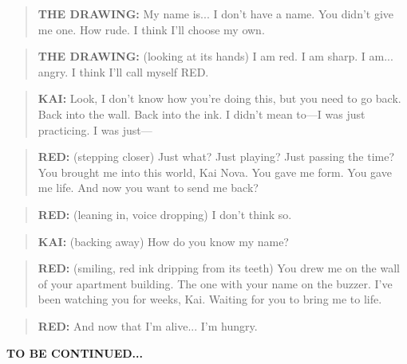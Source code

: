 \documentclass[
    language=english,
    doctype=comic-book,
    institution=none,
]{../../omnilatex}
\begin{document}
\vspace{0.5cm}

\begin{quote}
\textbf{THE DRAWING:} My name is... I don't have a name. You didn't give me one. How rude. I think I'll choose my own.
\end{quote}

\begin{quote}
\textbf{THE DRAWING:} (looking at its hands) I am red. I am sharp. I am... angry. I think I'll call myself RED.
\end{quote}

\begin{quote}
\textbf{KAI:} Look, I don't know how you're doing this, but you need to go back. Back into the wall. Back into the ink. I didn't mean to---I was just practicing. I was just---
\end{quote}

\begin{quote}
\textbf{RED:} (stepping closer) Just what? Just playing? Just passing the time? You brought me into this world, Kai Nova. You gave me form. You gave me life. And now you want to send me back?
\end{quote}

\begin{quote}
\textbf{RED:} (leaning in, voice dropping) I don't think so.
\end{quote}

\begin{quote}
\textbf{KAI:} (backing away) How do you know my name?
\end{quote}

\begin{quote}
\textbf{RED:} (smiling, red ink dripping from its teeth) You drew me on the wall of your apartment building. The one with your name on the buzzer. I've been watching you for weeks, Kai. Waiting for you to bring me to life.
\end{quote}

\begin{quote}
\textbf{RED:} And now that I'm alive... I'm hungry.
\end{quote}

\begin{center}
\textbf{TO BE CONTINUED...}
\end{center}

\vspace{1cm}
\end{document}
